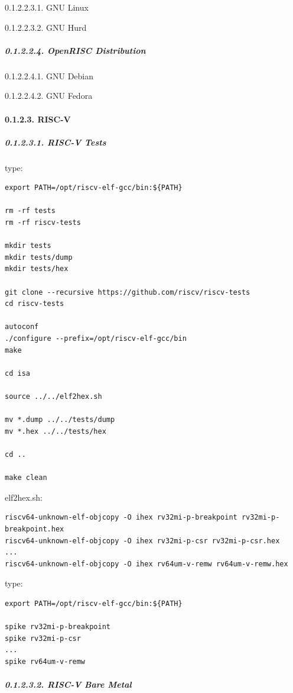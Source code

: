 \documentclass[
]{article}
\begin{document}
0.1.2.2.3.1. GNU Linux

0.1.2.2.3.2. GNU Hurd

\hypertarget{openrisc-distribution}{%
\subparagraph{0.1.2.2.4. OpenRISC
Distribution}\label{openrisc-distribution}}

0.1.2.2.4.1. GNU Debian

0.1.2.2.4.2. GNU Fedora

\hypertarget{risc-v}{%
\paragraph{0.1.2.3. RISC-V}\label{risc-v}}

\hypertarget{risc-v-tests}{%
\subparagraph{0.1.2.3.1. RISC-V Tests}\label{risc-v-tests}}

type:

\begin{verbatim}
export PATH=/opt/riscv-elf-gcc/bin:${PATH}

rm -rf tests
rm -rf riscv-tests

mkdir tests
mkdir tests/dump
mkdir tests/hex

git clone --recursive https://github.com/riscv/riscv-tests
cd riscv-tests

autoconf
./configure --prefix=/opt/riscv-elf-gcc/bin
make

cd isa

source ../../elf2hex.sh

mv *.dump ../../tests/dump
mv *.hex ../../tests/hex

cd ..

make clean
\end{verbatim}

elf2hex.sh:

\begin{verbatim}
riscv64-unknown-elf-objcopy -O ihex rv32mi-p-breakpoint rv32mi-p-breakpoint.hex
riscv64-unknown-elf-objcopy -O ihex rv32mi-p-csr rv32mi-p-csr.hex
...
riscv64-unknown-elf-objcopy -O ihex rv64um-v-remw rv64um-v-remw.hex
\end{verbatim}

type:

\begin{verbatim}
export PATH=/opt/riscv-elf-gcc/bin:${PATH}

spike rv32mi-p-breakpoint
spike rv32mi-p-csr
...
spike rv64um-v-remw
\end{verbatim}

\hypertarget{risc-v-bare-metal}{%
\subparagraph{0.1.2.3.2. RISC-V Bare Metal}\label{risc-v-bare-metal}}
\end{document}

